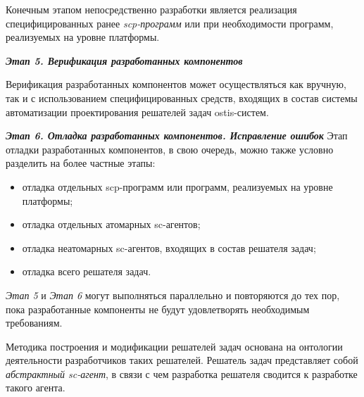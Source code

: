 Конечным этапом непосредственно разработки является реализация специфицированных ранее \textit{scp-программ} или при необходимости программ, реализуемых на уровне платформы.

\textbf{\textit{Этап 5. Верификация разработанных компонентов}}

Верификация разработанных компонентов может осуществляться как вручную, так и с использованием специфицированных средств, входящих в состав системы автоматизации проектирования решателей задач ostis-систем.

\textbf{\textit{Этап 6. Отладка разработанных компонентов. Исправление ошибок}}
Этап отладки разработанных компонентов, в свою очередь, можно также условно разделить на более частные этапы:

\begin{itemize}
    \item отладка отдельных scp-программ или программ, реализуемых на уровне платформы;
    \item отладка отдельных атомарных sc-агентов;
    \item отладка неатомарных sc-агентов, входящих в состав решателя задач;
    \item отладка всего решателя задач.
\end{itemize}

\textit{Этап 5} и \textit{Этап 6} могут выполняться параллельно и повторяются до тех пор, пока разработанные компоненты не будут удовлетворять необходимым требованиям.

Методика построения и модификации решателей задач основана на онтологии деятельности разработчиков таких решателей.
Решатель задач представляет собой \textit{абстрактный sc-агент}, в связи с чем разработка решателя сводится к разработке такого агента.

